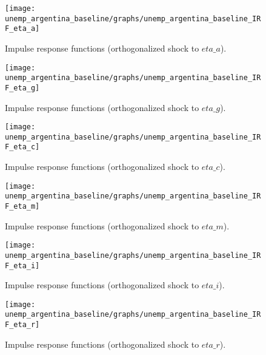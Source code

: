  
\begin{figure}[H]
\centering 
\texttt{[image: unemp\_argentina\_baseline/graphs/unemp\_argentina\_baseline\_IRF\_eta\_a]}
\caption{Impulse response functions (orthogonalized shock to $eta\_a$).}
\label{Fig:IRF:eta_a}
\end{figure}
 
\begin{figure}[H]
\centering 
\texttt{[image: unemp\_argentina\_baseline/graphs/unemp\_argentina\_baseline\_IRF\_eta\_g]}
\caption{Impulse response functions (orthogonalized shock to $eta\_g$).}
\label{Fig:IRF:eta_g}
\end{figure}
 
\begin{figure}[H]
\centering 
\texttt{[image: unemp\_argentina\_baseline/graphs/unemp\_argentina\_baseline\_IRF\_eta\_c]}
\caption{Impulse response functions (orthogonalized shock to $eta\_c$).}
\label{Fig:IRF:eta_c}
\end{figure}
 
\begin{figure}[H]
\centering 
\texttt{[image: unemp\_argentina\_baseline/graphs/unemp\_argentina\_baseline\_IRF\_eta\_m]}
\caption{Impulse response functions (orthogonalized shock to $eta\_m$).}
\label{Fig:IRF:eta_m}
\end{figure}
 
\begin{figure}[H]
\centering 
\texttt{[image: unemp\_argentina\_baseline/graphs/unemp\_argentina\_baseline\_IRF\_eta\_i]}
\caption{Impulse response functions (orthogonalized shock to $eta\_i$).}
\label{Fig:IRF:eta_i}
\end{figure}
 
\begin{figure}[H]
\centering 
\texttt{[image: unemp\_argentina\_baseline/graphs/unemp\_argentina\_baseline\_IRF\_eta\_r]}
\caption{Impulse response functions (orthogonalized shock to $eta\_r$).}
\label{Fig:IRF:eta_r}
\end{figure}
 
 
